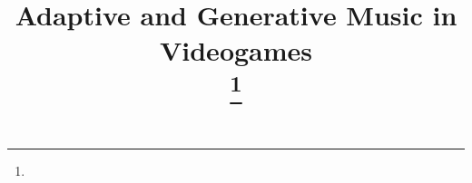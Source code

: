 \documentclass[conference]{IEEEtran}
\begin{document}
\title{Adaptive and Generative
Music in Videogames\\

{\footnotesize \textsuperscript{}}
\thanks{}
}



\maketitle














\vspace{12pt}
\end{document}
